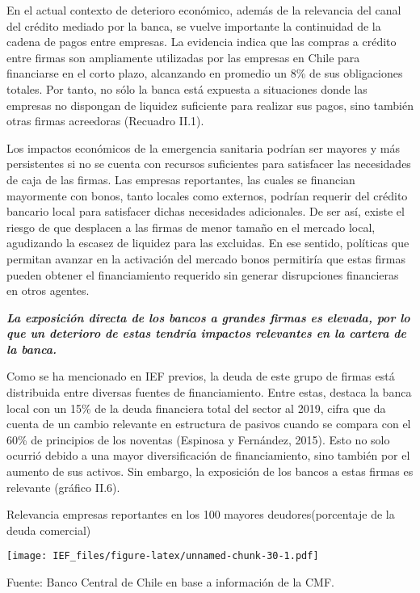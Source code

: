 \documentclass[
]{book}
\begin{document}
En el actual contexto de deterioro económico, además de la relevancia del
canal del crédito mediado por la banca, se vuelve importante la continuidad
de la cadena de pagos entre empresas. La evidencia indica que las compras
a crédito entre firmas son ampliamente utilizadas por las empresas en Chile
para financiarse en el corto plazo, alcanzando en promedio un 8\% de sus
obligaciones totales. Por tanto, no sólo la banca está expuesta a situaciones
donde las empresas no dispongan de liquidez suficiente para realizar sus
pagos, sino también otras firmas acreedoras (Recuadro II.1).

Los impactos económicos de la emergencia sanitaria podrían ser mayores y
más persistentes si no se cuenta con recursos suficientes para satisfacer las
necesidades de caja de las firmas. Las empresas reportantes, las cuales se
financian mayormente con bonos, tanto locales como externos, podrían requerir
del crédito bancario local para satisfacer dichas necesidades adicionales. De
ser así, existe el riesgo de que desplacen a las firmas de menor tamaño en el
mercado local, agudizando la escasez de liquidez para las excluidas. En ese
sentido, políticas que permitan avanzar en la activación del mercado bonos
permitiría que estas firmas pueden obtener el financiamiento requerido sin
generar disrupciones financieras en otros agentes.

\textbf{\emph{La exposición directa de los bancos a grandes firmas es elevada,
por lo que un deterioro de estas tendría impactos relevantes en la
cartera de la banca.}}

Como se ha mencionado en IEF previos, la deuda de este grupo de firmas está
distribuida entre diversas fuentes de financiamiento. Entre estas, destaca la
banca local con un 15\% de la deuda financiera total del sector al 2019, cifra que
da cuenta de un cambio relevante en estructura de pasivos cuando se compara
con el 60\% de principios de los noventas (Espinosa y Fernández, 2015). Esto no
solo ocurrió debido a una mayor diversificación de financiamiento, sino también
por el aumento de sus activos. Sin embargo, la exposición de los bancos a estas
firmas es relevante (gráfico II.6).

Relevancia empresas reportantes en los 100 mayores deudores(porcentaje de la deuda comercial)

\texttt{[image: IEF\_files/figure-latex/unnamed-chunk-30-1.pdf]}

Fuente: Banco Central de Chile en base a información de la CMF.
\end{document}
